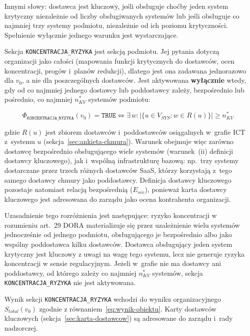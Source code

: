 Innymi słowy: dostawca jest kluczowy, jeśli
obsługuje choćby jeden system krytyczny 
{niezależnie od liczby obsługiwanych systemów} lub jeśli obsługuje co najmniej trzy systemy podmiotu, niezależnie od ich poziomu krytyczności.
Spełnienie wyłącznie jednego warunku {jest wystarczające}.

Sekcja \texttt{KONCENTRACJA\_RYZYKA} jest sekcją podmiotu.
Jej pytania dotyczą organizacji jako całości (mapowania funkcji
krytycznych do dostawców, ocen koncentracji, progów i~planów redukcji),
dlatego jest ona zadawana jednorazowo dla $v_0$, a nie dla
poszczególnych dostawców. Jest aktywowana \textbf{wyłącznie} wtedy,
gdy od co najmniej jednego dostawcy lub poddostawcy zależy, bezpośrednio
lub pośrednio, co najmniej $n_{KV}^{*}$ systemów podmiotu:

\begin{equation}
\Phi_{\texttt{KONCENTRACJA\_RYZYKA}}(v_0) = \texttt{TRUE}
\iff
\exists\, w :
\bigl|\{u \in V_{SYS} : w \in R(u)\}\bigr|
\geq n_{KV}^{*}
\label{eq:koncentracja-aktywacja}
\end{equation}

\noindent gdzie $R(u)$ jest zbiorem dostawców i~poddostawców osiągalnych
w~grafie ICT z~systemu $u$ (sekcja~\ref{sec:ankieta-chmura}). Warunek obejmuje
więc zarówno dostawcę bezpośrednio obsługującego wiele systemów (warunek~(ii)
definicji dostawcy kluczowego), jak i~wspólną infrastrukturę bazową: np.\ trzy
systemy dostarczane przez trzech różnych dostawców SaaS, którzy korzystają
z~tego samego dostawcy chmury jako poddostawcy. Definicja dostawcy kluczowego
pozostaje natomiast relacją bezpośrednią ($E_{svc}$), ponieważ karta dostawcy
kluczowego jest adresowana do zarządu jako ocena kontrahenta organizacji.

\noindent Uzasadnienie tego rozróżnienia jest
następujące: ryzyko koncentracji w rozumieniu
art.~29 DORA materializuje się przez uzależnienie
wielu systemów jednocześnie od jednego podmiotu, obsługującego je bezpośrednio
albo jako wspólny poddostawca kilku dostawców. Dostawca obsługujący jeden system
krytyczny jest kluczowy z uwagi na wagę tego systemu,
lecz nie generuje ryzyka koncentracji w sensie
regulacyjnym. Jeżeli w~grafie nie ma dostawcy ani poddostawcy, od którego
zależy co najmniej $n_{KV}^{*}$ systemów, sekcja \texttt{KONCENTRACJA\_RYZYKA} nie jest aktywowana.

Wynik sekcji \texttt{KONCENTRACJA\_RYZYKA} wchodzi do wyniku organizacyjnego $S_{total}(v_0)$ zgodnie
z równaniem~\eqref{eq:wynik-obiektu}.
Karty dostawców kluczowych (sekcja~\ref{sec:karta-dostawcow}) są adresowane do zarządu i~rady nadzorczej.
